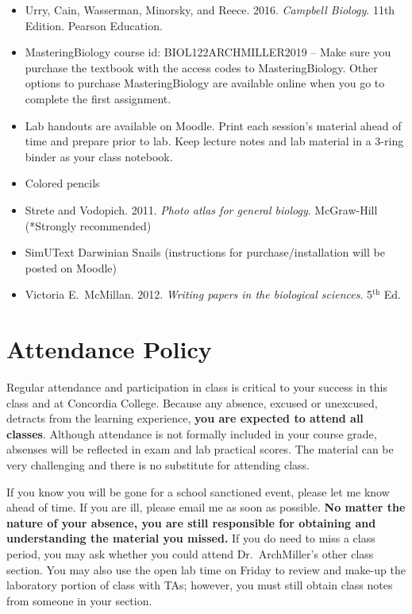 \documentclass{tufte-handout}
\begin{document}
\begin{fullwidth}
\begin{itemize}
	\item Urry, Cain, Wasserman, Minorsky, and Reece. 2016. \emph{Campbell Biology}. 11th Edition. Pearson Education.
	\item MasteringBiology course id: BIOL122ARCHMILLER2019 -- Make sure you purchase the textbook with the access codes to MasteringBiology. Other options to purchase MasteringBiology are available online when you go to complete the first assignment. 
	\item Lab handouts are available on Moodle. Print each session's material ahead of time and prepare prior to lab. Keep lecture notes and lab material in a 3-ring binder as your class notebook. 
	\item Colored pencils
	\item Strete and Vodopich. 2011. \emph{Photo atlas for general biology}. McGraw-Hill (*Strongly recommended)
	\item SimUText Darwinian Snails (instructions for purchase/installation will be posted on Moodle)
	\item Victoria E.\ McMillan. 2012. \emph{Writing papers in the biological sciences}. 5$^\mathrm{th}$ Ed.
\end{itemize}

\section{Attendance Policy}

Regular attendance and participation in class is critical to your success in this class and at Concordia College. Because any absence, excused or unexcused, detracts from the learning experience, \textbf{you are expected to attend all classes}. Although attendance is not formally included in your course grade, absenses will be reflected in exam and lab practical scores. The material can be very challenging and there is no substitute for attending class. 




If you know you will be gone for a school sanctioned event, please let me know ahead of time. If you are ill, please email me as soon as possible. \textbf{No matter the nature of your absence, you are still responsible for obtaining and understanding the material you missed.} If you do need to miss a class period, you may ask whether you could attend Dr.\ ArchMiller's other class section. You may also use the open lab time on Friday to review and make-up the laboratory portion of class with TAs; however, you must still obtain class notes from someone in your section.  


\end{fullwidth}
\end{document}
